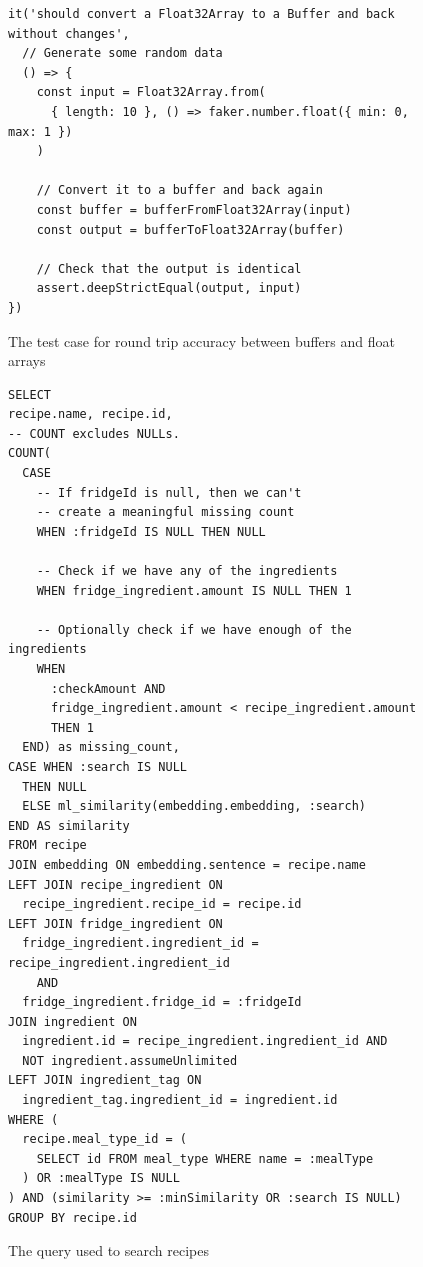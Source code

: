 \begin{figure}[h]
  \centering
  \caption{\label{fig:buffer_float_array}The test case for round trip accuracy between buffers and float arrays}
  \begin{verbatim}
it('should convert a Float32Array to a Buffer and back without changes',
  // Generate some random data
  () => {
    const input = Float32Array.from(
      { length: 10 }, () => faker.number.float({ min: 0, max: 1 })
    )

    // Convert it to a buffer and back again
    const buffer = bufferFromFloat32Array(input)
    const output = bufferToFloat32Array(buffer)

    // Check that the output is identical
    assert.deepStrictEqual(output, input)
})
  \end{verbatim}
\end{figure}

\cleartoleftpage\begin{figure}
  \centering
  \caption{\label{fig:search_query}The query used to search recipes}
  \begin{verbatim}
SELECT
recipe.name, recipe.id,
-- COUNT excludes NULLs.
COUNT(
  CASE
    -- If fridgeId is null, then we can't
    -- create a meaningful missing count
    WHEN :fridgeId IS NULL THEN NULL

    -- Check if we have any of the ingredients
    WHEN fridge_ingredient.amount IS NULL THEN 1

    -- Optionally check if we have enough of the ingredients
    WHEN
      :checkAmount AND
      fridge_ingredient.amount < recipe_ingredient.amount
      THEN 1
  END) as missing_count,
CASE WHEN :search IS NULL
  THEN NULL
  ELSE ml_similarity(embedding.embedding, :search)
END AS similarity
FROM recipe
JOIN embedding ON embedding.sentence = recipe.name
LEFT JOIN recipe_ingredient ON
  recipe_ingredient.recipe_id = recipe.id
LEFT JOIN fridge_ingredient ON
  fridge_ingredient.ingredient_id = recipe_ingredient.ingredient_id
    AND
  fridge_ingredient.fridge_id = :fridgeId
JOIN ingredient ON
  ingredient.id = recipe_ingredient.ingredient_id AND
  NOT ingredient.assumeUnlimited
LEFT JOIN ingredient_tag ON
  ingredient_tag.ingredient_id = ingredient.id
WHERE (
  recipe.meal_type_id = (
    SELECT id FROM meal_type WHERE name = :mealType
  ) OR :mealType IS NULL
) AND (similarity >= :minSimilarity OR :search IS NULL)
GROUP BY recipe.id
  \end{verbatim}
\end{figure}


